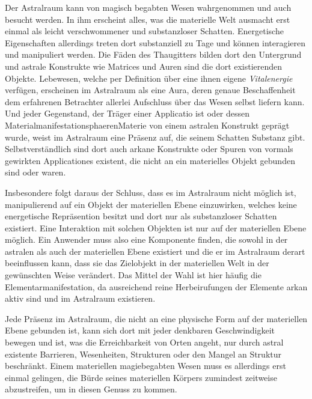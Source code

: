 \documentclass[a5paper,8pt]{book}
\begin{document}
\begin{multicols}{2}
Der Astralraum kann von magisch begabten Wesen wahrgenommen und auch besucht werden. In ihm erscheint
alles, was die materielle Welt ausmacht erst einmal als leicht verschwommener und substanzloser Schatten. Energetische
Eigenschaften allerdings treten dort substanziell zu Tage und können interagieren und manipuliert werden. Die Fäden des
Thaugitters bilden dort den Untergrund und astrale Konstrukte wie Matrices und Auren sind die dort existierenden
Objekte. Lebewesen, welche per Definition über eine ihnen eigene \textit{Vitalenergie} verfügen, erscheinen im
Astralraum als eine Aura, deren genaue Beschaffenheit dem erfahrenen Betrachter allerlei Aufschluss über das Wesen
selbst liefern kann. Und jeder Gegenstand, der Träger einer Applicatio ist oder dessen
MaterialmanifestationsphaerenMaterie von einem astralen Konstrukt geprägt wurde, weist im Astralraum
eine Präsenz auf, die seinem Schatten Substanz gibt. Selbstverständlich sind dort auch arkane Konstrukte oder Spuren von
vormals gewirkten Applicationes existent, die nicht an ein materielles Objekt gebunden sind oder waren.

Insbesondere folgt daraus der Schluss, dass es im Astralraum nicht möglich ist, manipulierend auf ein Objekt der
materiellen Ebene einzuwirken, welches keine energetische Repräsention besitzt und dort nur als substanzloser Schatten
existiert. Eine Interaktion mit solchen Objekten ist nur auf der materiellen Ebene möglich. Ein Anwender muss
also eine Komponente finden, die sowohl in der astralen als auch der materiellen Ebene existiert und die er im Astralraum derart
beeinflussen kann, dass sie das Zielobjekt in der materiellen Welt in der gewünschten Weise verändert. Das Mittel der
Wahl ist hier häufig die Ele\-mentar\-mani\-festa\-tion, da ausreichend reine Herbeirufungen der Elemente arkan aktiv
sind und im Astralraum existieren.
\vspace{25pt}

Jede Präsenz im Astralraum, die nicht an eine physische Form auf der materiellen Ebene gebunden ist, kann sich dort mit
jeder denkbaren Geschwindigkeit bewegen und ist, was die Erreichbarkeit von Orten angeht, nur durch astral existente
Barrieren, Wesenheiten, Strukturen oder den Mangel an Struktur beschränkt. Einem materiellen magiebegabten Wesen muss es
allerdings erst einmal gelingen, die Bürde seines materiellen Körpers zumindest zeitweise
abzustreifen, um in diesen Genuss zu kommen.

\end{multicols}
\noindent\hrulefill
\end{document}

